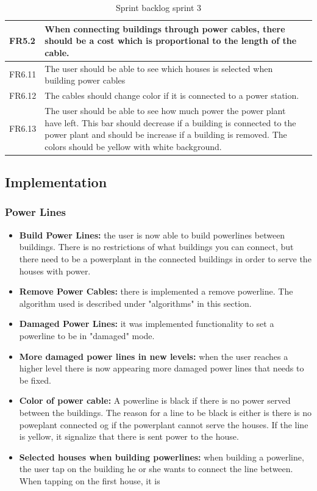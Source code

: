 \begin{table}
\begin{tabular}{| p{1.2cm} | p{8cm} | p{3cm} |}
		FR5.2 & When connecting buildings through power cables, there should be a 
		cost which is proportional to the length of the cable. & \\ \hline

		FR6.11 & The user should be able to see which houses is selected when 
		building power cables & \\ \hline

		FR6.12 & The cables should change color if it is connected to a power 
		station. & \\ \hline

		FR6.13 & The user should be able to see how much power the power plant have 
		left. This bar should decrease if a building is connected to the power plant 
		and should be increase if a building is removed. The colors should be yellow 
		with white background. & \\ \hline

	\end{tabular}
	\caption{Sprint backlog sprint 3}
	\end{table}

\subsection{Implementation}
	
	\subsubsection{Power Lines}
		\begin{itemize}
			\item {\bf Build Power Lines: } the user is now able to build powerlines
			between buildings. There is no restrictions of what buildings you can connect, 
			but there need to be a powerplant in the connected buildings in order to serve the houses 
			with power.
			\item {\bf Remove Power Cables: } there is implemented a remove powerline. The 
			algorithm used is described under "algorithms" in this section. 
			\item {\bf Damaged Power Lines: } it was implemented functionality to set a 
			powerline to be in "damaged" mode. 
			\item {\bf More damaged power lines in new levels: } when the user reaches a higher level
			there is now appearing more damaged power lines that needs to be fixed. 
			\item {\bf Color of power cable: } A powerline is black if there is no power served between
			the buildings. The reason for a line to be black is either is there is no poweplant
			connected og if the powerplant cannot serve the houses. If the line is yellow, it 
			signalize that there is sent power to the house. 
			\item {\bf Selected houses when building powerlines: } when building a powerline, 
			the user tap on the building he or she wants to connect the line between. When tapping on the
			first house, it is 
		\end{itemize}

